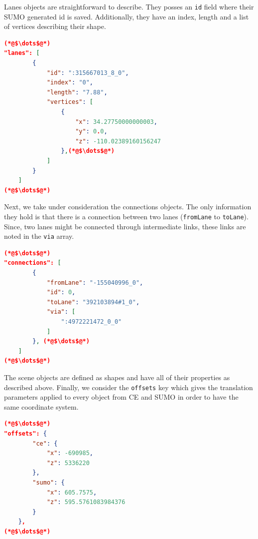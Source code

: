Lanes objects are straightforward to describe. They posses an \texttt{id} field where their SUMO generated id is saved. Additionally, they have an index, length and a list of vertices describing their shape.\\
 
\begin{scriptsize}
        \begin{lstlisting}[language=json,firstnumber=1,caption={General overview of the lanes key in the JSON export format.},label={lis:format-node}]
(*@$\dots$@*)
"lanes": [
        {
            "id": ":315667013_8_0",
            "index": "0",
            "length": "7.88",
            "vertices": [
                {
                    "x": 34.27750000000003,
                    "y": 0.0,
                    "z": -110.02389160156247
                },(*@$\dots$@*)
            ]
        }
    ]
(*@$\dots$@*)
	   \end{lstlisting}
    \end{scriptsize}
    
Next, we take under consideration the connections objects. The only information they hold is that there is a connection between two lanes (\texttt{fromLane} to \texttt{toLane}). Since, two lanes might be connected through intermediate links, these links are noted in the \texttt{via} array.\\
    
    \begin{scriptsize}
        \begin{lstlisting}[language=json,firstnumber=1,caption={General overview of the connection key in the JSON export format.},label={lis:format-node}]
(*@$\dots$@*)
"connections": [
        {
            "fromLane": "-155040996_0",
            "id": 0,
            "toLane": "392103894#1_0",
            "via": [
                ":4972221472_0_0"
            ]
        }, (*@$\dots$@*)
    ]
(*@$\dots$@*)
	   \end{lstlisting}
    \end{scriptsize}
    
The scene objects are defined as shapes and have all of their properties as described above. Finally, we consider the \texttt{offsets} key which gives the translation parameters applied to every object from CE and SUMO in order to have the same coordinate system. \\

    \begin{scriptsize}
        \begin{lstlisting}[language=json,firstnumber=1,caption={General overview of the offsets key in the JSON export format.},label={lis:format-node}]
(*@$\dots$@*)
"offsets": {
        "ce": {
            "x": -690985,
            "z": 5336220
        },
        "sumo": {
            "x": 605.7575,
            "z": 595.5761083984376
        }
    },
(*@$\dots$@*)
	   \end{lstlisting}
    \end{scriptsize}
    
